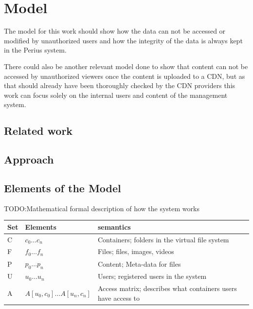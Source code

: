 \documentclass[a4paper,12pt]{article}
\newcommand{\fix}{\colorbox{yellow!30}{TODO:}}
\begin{document}
\newpage 

\label{sec:model}
\section{Model}
The model for this work should show how the data can not be accessed or modified by unauthorized
users and how the integrity of the data is always kept in the Perius system. 

There could also be another relevant model done to show that content can not be accessed by
unauthorized viewers once the content is uploaded to a CDN, but as that should already have been
thoroughly checked by the CDN providers this work can focus solely on the internal users and content
of the management system. 

\subsection{Related work}

\subsection{Approach}

\subsection{Elements of the Model}
\fix Mathematical formal description of how the system works

\begin{center}
    \begin{tabular}{ | l | l | l | p{5cm} |}
        \hline
        Set & Elements & semantics \\ \hline
        C   & $c_0\dots c_n$                & Containers; folders in the virtual file system\\ \hline
        F   & $f_0\dots f_n$                & Files; files, images, videos\\ \hline
        P   & $p_0\dots p_n$                & Content; Meta-data for files\\ \hline
        U   & $u_0\dots u_n$                & Users; registered users in the system\\ \hline
        A   & $A[u_0,c_0]\dots A[u_n, c_n]$ & Access matrix; describes what containers users have access to\\ \hline
    \end{tabular}
\end{center}
\end{document}
